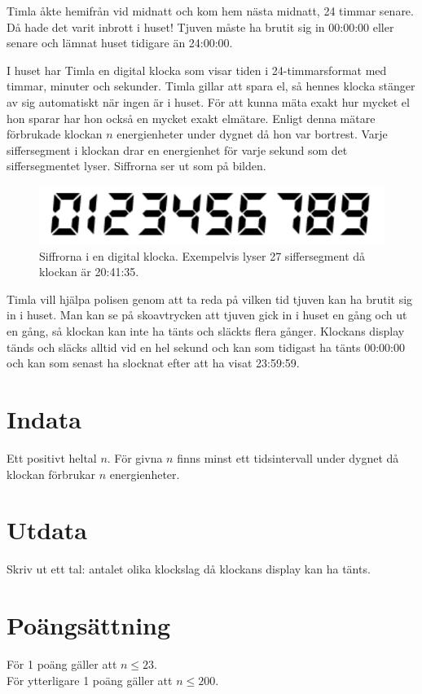 Timla åkte hemifrån vid midnatt och kom hem nästa midnatt, 24 timmar senare. Då hade det varit inbrott i huset! Tjuven måste ha brutit sig in 00:00:00 eller senare och lämnat huset tidigare än 24:00:00.

I huset har Timla en digital klocka som visar tiden i 24-timmarsformat med timmar, minuter och sekunder. Timla gillar att spara el, så hennes klocka stänger av sig automatiskt när ingen är i huset. För att kunna mäta exakt hur mycket el hon sparar har hon också en mycket exakt elmätare. Enligt denna mätare förbrukade klockan $n$ energienheter under dygnet då hon var bortrest. Varje siffersegment i klockan drar en energienhet för varje sekund som det siffersegmentet lyser. Siffrorna ser ut som på bilden.

\begin{figure}[!h]
\begin{center}
  \includegraphics[width=12cm]{illustration.png}
\end{center}
  \caption{Siffrorna i en digital klocka. Exempelvis lyser 27 siffersegment då klockan är 20:41:35.}
\end{figure}

Timla vill hjälpa polisen genom att ta reda på vilken tid tjuven kan ha brutit sig in i huset. Man kan se på skoavtrycken att tjuven gick in i huset en gång och ut en gång, så klockan kan inte ha tänts och släckts flera gånger. Klockans display tänds och släcks alltid vid en hel sekund och kan som tidigast ha tänts 00:00:00 och kan som senast ha slocknat efter att ha visat 23:59:59.

\section*{Indata}
Ett positivt heltal $n$. För givna $n$ finns minst ett tidsintervall under dygnet då klockan förbrukar $n$ energienheter.

\section*{Utdata}
Skriv ut ett tal: antalet olika klockslag då klockans display kan ha tänts. 

\section*{Poängsättning}
För 1 poäng gäller att $n \le 23$. \\
För ytterligare 1 poäng gäller att $n \le 200$.

